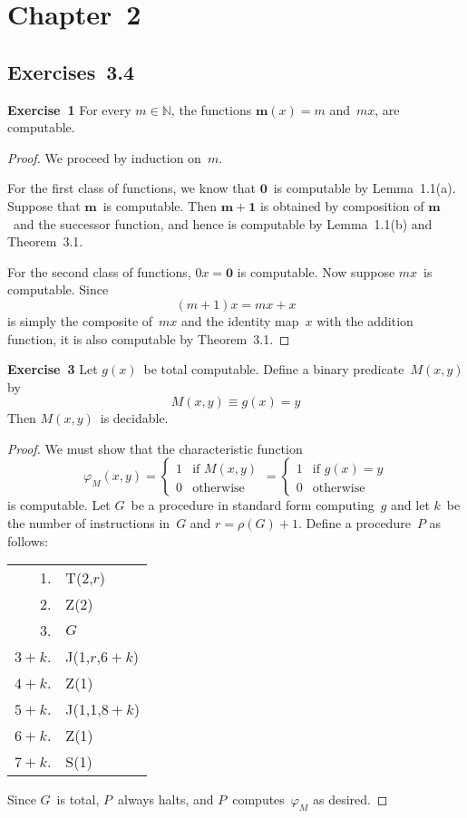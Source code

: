 \documentclass[letterpaper]{article}
\newcommand{\exercise}[2][]{\noindent\textbf{Exercise~{#2}}\ifthenelse{\isempty{#1}}{\textbf{.}}{ ({#1})\textbf{.}}}
\newcommand{\N}{\mathbb{N}}
\theoremstyle{plain}
\theoremstyle{definition}
\theoremstyle{remark}
\begin{document}
\section*{Chapter~2}
\subsection*{Exercises~3.4}
\exercise{1}
For every $m\in\N$, the functions $\mathbf{m}(x)=m$ and~$mx$, are computable.
\begin{proof}
We proceed by induction on~$m$.

For the first class of functions, we know that $\mathbf{0}$~is computable by Lemma~1.1(a). Suppose that $\mathbf{m}$~is computable. Then $\mathbf{m+1}$ is obtained by composition of $\mathbf{m}$~and the successor function, and hence is computable by Lemma~1.1(b) and Theorem~3.1.

For the second class of functions, $0x=\mathbf{0}$ is computable. Now suppose $mx$~is computable. Since
$$(m+1)x=mx+x$$
is simply the composite of~$mx$ and the identity map~$x$ with the addition function, it is also computable by Theorem~3.1.
\end{proof}

\exercise{3}
Let $g(x)$~be total computable. Define a binary predicate~$M(x,y)$ by
$$M(x,y)\equiv g(x)=y$$
Then $M(x,y)$~is decidable.
\begin{proof}
We must show that the characteristic function
$$\varphi_M(x,y)=
\begin{cases}
1&\text{if }M(x,y)\\
0&\text{otherwise}
\end{cases}=
\begin{cases}
1&\text{if }g(x)=y\\
0&\text{otherwise}
\end{cases}$$
is computable. Let $G$~be a procedure in standard form computing~$g$ and let $k$~be the number of instructions in~$G$ and $r=\rho(G)+1$. Define a procedure~$P$ as follows:
\begin{center}
\begin{tabular}{rl}
1.&T(2,$r$)\\
2.&Z(2)\\
3.&$G$\\
$3+k$.&J(1,$r$,$6+k$)\\
$4+k$.&Z(1)\\
$5+k$.&J(1,1,$8+k$)\\
$6+k$.&Z(1)\\
$7+k$.&S(1)
\end{tabular}
\end{center}
Since $G$~is total, $P$~always halts, and $P$~computes~$\varphi_M$ as desired.
\end{proof}
\end{document}
